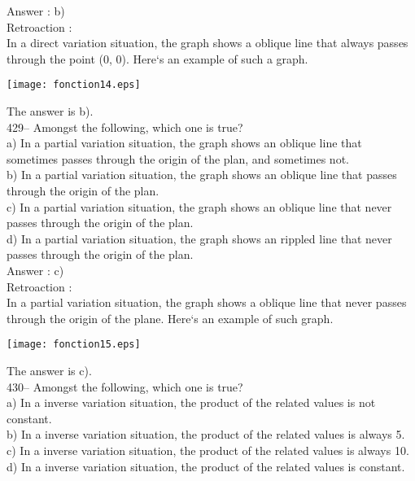 ﻿\documentclass[letterpaper, 12pt]{article}
\begin{document}
Answer :  b)\\

Retroaction : \\
In a direct variation situation, the graph shows a
oblique line that always passes through the point (0, 0).  Here`s an example of such a graph.\\
    \begin{center}
    \texttt{[image: fonction14.eps]}
    \end{center}

The answer is b).\\


429-- Amongst the following, which one is true?\\
a) In a partial variation situation, the graph shows an
oblique line that sometimes passes through the origin of the plan, and sometimes not.\\
b) In a partial variation situation, the graph shows an
oblique line that passes through the origin of the plan.\\
c) In a partial variation situation, the graph shows an
oblique line that never passes through the origin of the plan.\\
d) In a partial variation situation, the graph shows an
rippled line that never passes through the origin of the plan.\\

Answer :  c)\\

Retroaction : \\
In a partial variation situation, the graph shows a
oblique line that never passes through the origin of the plane. Here`s an example of such graph.\\
    \begin{center}
    \texttt{[image: fonction15.eps]}
    \end{center}
The answer is c).\\


430-- Amongst the following, which one is true?\\
a) In a inverse variation situation, the product of the related values
is not constant.\\
b) In a inverse variation situation, the product of the related values
is always 5.\\
c) In a inverse variation situation, the product of the related values
is always 10.\\
d) In a inverse variation situation, the product of the related values
is constant.\\
\end{document}
